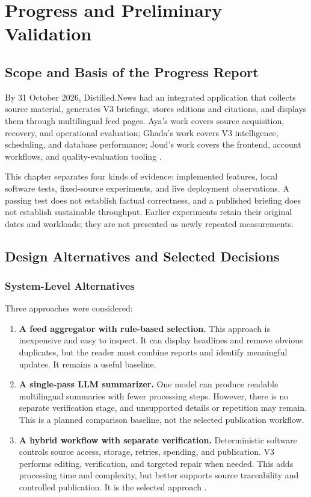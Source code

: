 \chapter{Progress and Preliminary Validation}
\label{chap:progress}

\section{Scope and Basis of the Progress Report}

By 31 October 2026, Distilled.News had an integrated application that collects source material, generates V3 briefings, stores editions and citations, and displays them through multilingual feed pages. Aya's work covers source acquisition, recovery, and operational evaluation; Ghada's work covers V3 intelligence, scheduling, and database performance; Joud's work covers the frontend, account workflows, and quality-evaluation tooling \cite{currentintegration,preservation,localquality}.

This chapter separates four kinds of evidence: implemented features, local software tests, fixed-source experiments, and live deployment observations. A passing test does not establish factual correctness, and a published briefing does not establish sustainable throughput. Earlier experiments retain their original dates and workloads; they are not presented as newly repeated measurements.

\section{Design Alternatives and Selected Decisions}

\subsection{System-Level Alternatives}

Three approaches were considered:
\begin{enumerate}
\item \textbf{A feed aggregator with rule-based selection.} This approach is inexpensive and easy to inspect. It can display headlines and remove obvious duplicates, but the reader must combine reports and identify meaningful updates. It remains a useful baseline.
\item \textbf{A single-pass LLM summarizer.} One model can produce readable multilingual summaries with fewer processing steps. However, there is no separate verification stage, and unsupported details or repetition may remain. This is a planned comparison baseline, not the selected publication workflow.
\item \textbf{A hybrid workflow with separate verification.} Deterministic software controls source access, storage, retries, spending, and publication. V3 performs editing, verification, and targeted repair when needed. This adds processing time and complexity, but better supports source traceability and controlled publication. It is the selected approach \cite{v3overnight,v3twenty}.
\end{enumerate}

